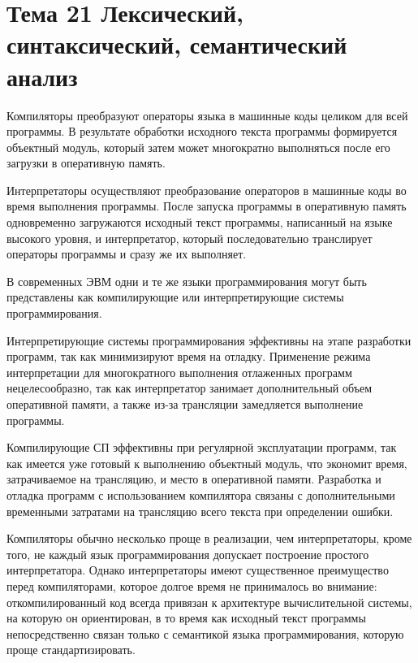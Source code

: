 \newpage 
\chapter{Тема 21 Лексический, синтаксический, семантический анализ}

Компиляторы преобразуют операторы языка в машинные коды целиком для всей программы. В результате обработки исходного текста программы формируется объектный модуль, который затем может многократно выполняться после его загрузки в оперативную память.

Интерпретаторы осуществляют преобразование операторов в машинные коды во время выполнения программы. После запуска программы в оперативную память одновременно загружаются исходный текст программы, написанный на языке высокого уровня, и интерпретатор, который последовательно транслирует операторы программы и сразу же их выполняет.

В современных ЭВМ одни и те же языки программирования могут быть представлены как компилирующие или интерпретирующие системы программирования.

Интерпретирующие системы программирования эффективны на этапе разработки программ, так как минимизируют время на отладку. Применение режима интерпретации для многократного выполнения отлаженных программ нецелесообразно, так как интерпретатор занимает дополнительный объем оперативной памяти, а также из-за трансляции замедляется выполнение программы.

Компилирующие СП эффективны при регулярной эксплуатации программ, так как имеется уже готовый к выполнению объектный модуль, что экономит время, затрачиваемое на трансляцию, и место в оперативной памяти. Разработка и отладка программ с использованием компилятора связаны с дополнительными временными затратами на трансляцию всего текста при определении ошибки.

Компиляторы обычно несколько проще в реализации, чем интерпретаторы, кроме того, не каждый язык программирования допускает построение простого интерпретатора. Однако интерпретаторы имеют существенное преимущество перед компиляторами, которое долгое время не принималось во внимание: откомпилированный код всегда привязан к архитектуре вычислительной системы, на которую он ориентирован, в то время как исходный текст программы непосредственно связан только с семантикой языка программирования, которую проще стандартизировать.

